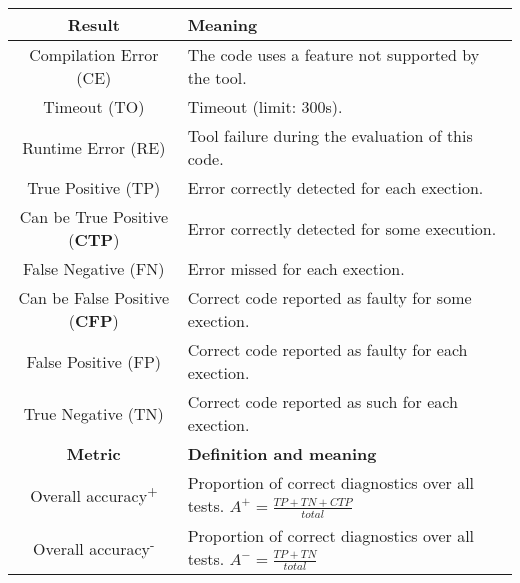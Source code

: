 \documentclass{article}
\begin{document}
\begin{table*}[h]
  \begin{center}
    \begin{tabular}{|c|l|}\hline
      \textbf{Result}&\textbf{Meaning}\\\hline
      Compilation Error (CE) &The code uses a feature not supported by the tool.\\\hline
      Timeout (TO) & Timeout (limit: 300s).\\\hline
      Runtime Error (RE) & Tool failure during the evaluation of this code.\\\hline\hline
      True Positive (TP)&Error correctly detected for each exection.\\\hline
      Can be True Positive (\textbf{CTP})&Error correctly detected for some execution.\\\hline
      False Negative (FN)&Error missed for each exection.\\\hline
      Can be False Positive (\textbf{CFP})&Correct code reported as faulty for some exection.\\\hline
      False Positive (FP)&Correct code reported as faulty for each exection.\\\hline
      True Negative (TN) &Correct code reported as such for each exection.\\\hline\hline
      \textbf{Metric}&\textbf{Definition and meaning}\\\hline
      Overall accuracy\textsuperscript{+}&\multirow{1.3}{*}{Proportion of correct diagnostics over all tests. $A^+=\frac{TP+TN+CTP}{total}$}\\[4pt]\hline
      Overall accuracy\textsuperscript{-}&\multirow{1.3}{*}{Proportion of correct diagnostics over all tests. $A^-=\frac{TP+TN}{total}$}\\[4pt]\hline


\end{tabular}
\end{center}
\end{table*}
\end{document}
